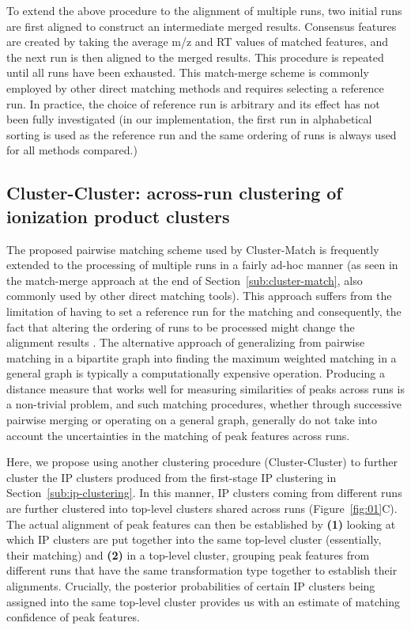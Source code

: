 To extend the above procedure to the alignment of multiple runs, two initial runs are first aligned to construct an intermediate merged results. Consensus features are created by taking the average m/z and RT values of matched features, and the next run is then aligned to the merged results. This procedure is repeated until all runs have been exhausted. This match-merge scheme is commonly employed by other direct matching methods \cite{Voss2011a, Pluskal2010} and requires selecting a reference run. In practice, the choice of reference run is arbitrary and its effect has not been fully investigated (in our implementation, the first run in alphabetical sorting is used as the reference run and the same ordering of runs is always used for all methods compared.)

\subsection{Cluster-Cluster: across-run clustering of ionization product clusters\label{sub:cluster-cluster}}

The proposed pairwise matching scheme used by Cluster-Match is frequently extended to the processing of multiple runs in a fairly ad-hoc manner (as seen in the match-merge approach at the end of Section~\ref{sub:cluster-match}, also commonly used by other direct matching tools). This approach suffers from the limitation of having to set a reference run for the matching and consequently, the fact that altering the ordering of runs to be processed might change the alignment results \cite{Smith2013}. The alternative approach of generalizing from pairwise matching in a bipartite graph into finding the maximum weighted matching in a general graph is typically a computationally expensive operation. Producing a distance measure that works well for measuring similarities of peaks across runs is a non-trivial problem, and such matching procedures, whether through successive pairwise merging or operating on a general graph, generally do not take into account the uncertainties in the matching of peak features across runs.

Here, we propose using another clustering procedure (Cluster-Cluster) to further cluster the IP clusters produced from the first-stage IP clustering in Section~\ref{sub:ip-clustering}. In this manner, IP clusters coming from different runs are further clustered into top-level clusters shared across runs (Figure~\ref{fig:01}C). The actual alignment of peak features can then be established by \textbf{(1)} looking at which IP clusters are put together into the same top-level cluster (essentially, their matching) and \textbf{(2)} in a top-level cluster, grouping peak features from different runs that have the same transformation type together to establish their alignments. Crucially, the posterior probabilities of certain IP clusters being assigned into the same top-level cluster provides us with an estimate of matching confidence of peak features.

